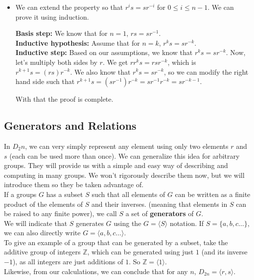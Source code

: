 \documentclass[12pt]{article}
\newcommand{\Z}{\mathbb{Z}}
\begin{document}
\begin{itemize}[label=$\diamond$]
        \item
            We can extend the property so that $r^is = sr^{-i}$
            for $0 \leqslant i \leqslant n-1$.
            We can prove it using induction. \\
            \begin{adjustwidth}{1cm}{1cm}
                \textbf{Basis step:}
                We know that for $n = 1$,
                $rs = sr^{-1}$. \\
                \textbf{Inductive hypothesis:}
                Assume that for $n = k$,
                $r^ks = sr^{-k}$. \\
                \textbf{Inductive step:}
                Based on our assumptions,
                we know that $r^ks = sr^{-k}$.
                Now, let's multiply both sides by $r$.
                We get $rr^ks = rsr^{-k}$,
                which is $r^{k+1}s = (rs)r^{-k}$.
                We also know that $r^ks = sr^{-k}$,
                so we can modify the right hand side such that
                $r^{k+1}s = (sr^{-1})r^{-k} = sr^{-1}r^{-k} = sr^{-k-1}$.
            \end{adjustwidth}
            With that the proof is complete. \\
    \end{itemize}


    \subsection*{Generators and Relations}

    In $D_2n$, we can very simply represent any element
    using only two elements $r$ and $s$
    (each can be used more than once).
    We can generalize this idea for arbitrary groups.
    They will provide us with a simple and easy way of describing
    and computing in many groups.
    We won't rigorously describe them now,
    but we will introduce them so they be taken advantage of. \\

    If a groups $G$ has a subset $S$
    such that all elements of $G$ can be written as a finite
    product of the elements of $S$ and their inverses.
    (meaning that elements in $S$ can be raised to any finite power),
    we call $S$ a set of \textbf{generators} of $G$. \\
    We will indicate that $S$ generates $G$ using
    the $G = \langle S \rangle$ notation.
    If $S = \{a, b, c \dots\}$,
    we can also directly write $G = \langle a, b, c \dots \rangle$. \\
    To give an example of a group that can be generated by a subset,
    take the additive group of integers $\Z$,
    which can be generated using just $1$ (and its inverse $-1$),
    as all integers are just additions of $1$.
    So $\Z = \langle 1 \rangle$. \\
    Likewise, from our calculations,
    we can conclude that for any $n$, $D_{2n} = \langle r, s \rangle$. \\
\end{document}
